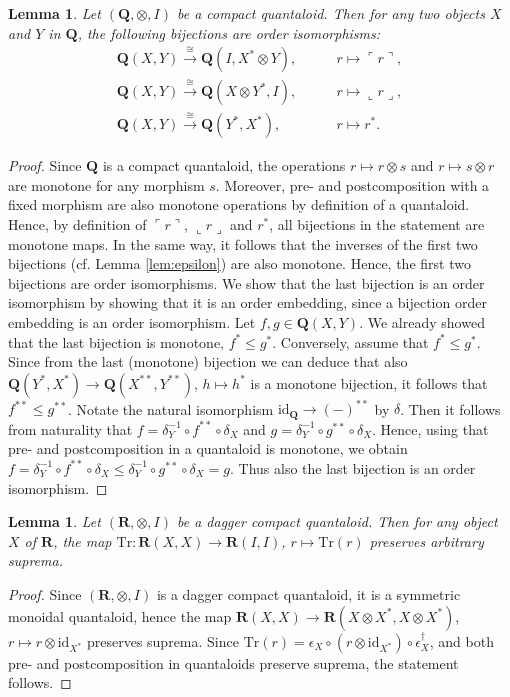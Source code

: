 \documentclass[12pt]{tac}
\newtheorem{lemma}[theorem]{Lemma}
\theoremstyle{definition}
\theoremstyle{remark}
\newcommand{\<}{\langle}
\renewcommand{\>}{\rangle}
\renewcommand{\:}{\colon}
\newcommand{\Tr}{\mathrm{Tr}}
\newcommand{\id}{\mathrm{id}}
\renewcommand{\name}[1]{\ulcorner #1\urcorner}
\newcommand{\coname}[1]{\llcorner #1\lrcorner}
\begin{document}
\begin{lemma}\label{lem:counit in compact quantaloid is order iso}
    Let $(\mathbf Q,\otimes,I)$ be a compact quantaloid. Then for any two objects $X$ and $Y$ in $\mathbf Q$, the following bijections are order isomorphisms: 
    \begin{align*}
        \mathbf Q(X,Y)\xrightarrow{\cong}\mathbf Q(I,X^*\otimes Y),& \qquad r\mapsto \name r,\\
           \mathbf Q(X,Y)\xrightarrow{\cong}\mathbf Q(X\otimes Y^*,I),& \qquad r\mapsto \coname r,\\
              \mathbf Q(X,Y)\xrightarrow{\cong}\mathbf Q(Y^*,X^*),& \qquad r\mapsto r^*.             
    \end{align*}
\end{lemma}
\begin{proof}
Since $\mathbf Q$ is a compact quantaloid, the operations $r\mapsto r\otimes s$ and $r\mapsto s\otimes r$ are monotone for any morphism $s$. Moreover, pre- and postcomposition with a fixed morphism are also monotone operations by definition of a quantaloid. Hence, by definition of $\name r$, $\coname r$ and $r^*$, all bijections in the statement are monotone maps. In the same way, it follows that the inverses of the first two bijections (cf. Lemma \ref{lem:epsilon}) are also monotone. Hence, the first two bijections are order isomorphisms. We show that the last bijection is an order isomorphism by showing that it is an order embedding, since a bijection order embedding is an order isomorphism.  Let $f,g\in\mathbf Q(X,Y)$. We already showed that the last bijection is monotone, $f^*\leq g^*$. Conversely, assume that $f^*\leq g^*$. Since from the last (monotone) bijection we can deduce that also $\mathbf Q(Y^*,X^*)\to\mathbf Q(X^{**},Y^{**})$, $h\mapsto h^*$ is a monotone bijection, it follows that $f^{**}\leq g^{**}$. 
Notate the natural isomorphism $\id_\mathbf Q\to (-)^{**}$ by $\delta$. Then it follows from naturality that $f=\delta_Y^{-1}\circ f^{**}\circ\delta_X$ and $g=\delta_Y^{-1}\circ g^{**}\circ\delta_X$. Hence, using that pre- and postcomposition in a quantaloid is monotone, we obtain $f=\delta_Y^{-1}\circ f^{**}\circ\delta_X\leq \delta_Y^{-1}\circ g^{**}\circ\delta_X=g$.
Thus also the last bijection is an order isomorphism.
\end{proof}


\begin{lemma}\label{lem:trace preserves suprema}
    Let $(\mathbf R,\otimes,I)$ be a dagger compact quantaloid. Then for any object $X$ of $\mathbf R$, the map $\Tr:\mathbf R(X,X)\to\mathbf R(I,I)$, $r\mapsto \Tr(r)$ preserves arbitrary suprema. 
\end{lemma}
\begin{proof}
Since $(\mathbf R,\otimes,I)$ is a dagger compact quantaloid, it is a symmetric monoidal quantaloid, hence the map $\mathbf R(X,X)\to\mathbf R(X\otimes X^*,X\otimes X^*)$, $r\mapsto r\otimes\id_{X^*}$ preserves suprema. Since $\Tr(r)=\epsilon_X\circ(r\otimes\id_{X^*})\circ \epsilon_X^\dag$, and both pre- and postcomposition in quantaloids preserve suprema, the statement follows.
\end{proof}
\end{document}
